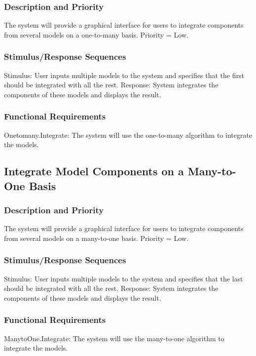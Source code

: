 \documentclass{article}
\begin{document}
\subsubsection{Description and Priority}
The system will provide a graphical interface for users to integrate components from several models on a one-to-many basis.  Priority = Low.

\subsubsection{Stimulus/Response Sequences}

Stimulus: User inputs multiple models to the system and specifies that the first should be integrated with all the rest.
Response: System integrates the components of these models and displays the result.

\subsubsection{Functional Requirements}

Onetomany.Integrate: The system will use the one-to-many algorithm to integrate the models.

\subsection{Integrate Model Components on a Many-to-One Basis}
\subsubsection{Description and Priority}
The system will provide a graphical interface for users to integrate components from several models on a many-to-one basis.  Priority = Low.

\subsubsection{Stimulus/Response Sequences}

Stimulus: User inputs multiple models to the system and specifies that the last should be integrated with all the rest.
Response: System integrates the components of these models and displays the result.

\subsubsection{Functional Requirements}

ManytoOne.Integrate: The system will use the many-to-one algorithm to integrate the models.
\end{document}
